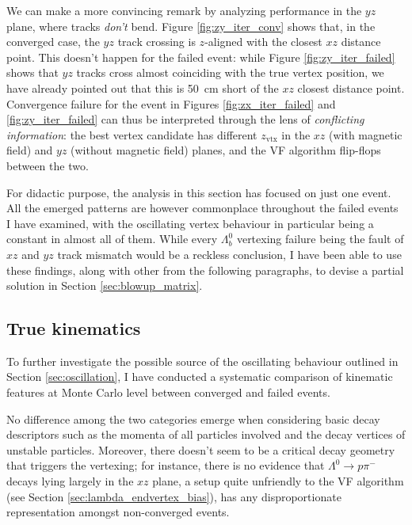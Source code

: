 We can make a more convincing remark by analyzing performance in the $yz$ plane, where tracks \textit{don't} bend.
Figure \ref{fig:zy_iter_conv} shows that, in the converged case, the $yz$ track crossing is $z$-aligned with the closest $xz$ distance point.
This doesn't happen for the failed event: while Figure \ref{fig:zy_iter_failed} shows that $yz$ tracks cross almost coinciding with the true vertex position, we have already pointed out that this is \SI{50}{cm} short of the $xz$ closest distance point.
Convergence failure for the event in Figures \ref{fig:zx_iter_failed} and \ref{fig:zy_iter_failed} can thus be interpreted through the lens of \textit{conflicting information}:
the best vertex candidate has different $z_\text{vtx}$ in the $xz$ (with magnetic field) and $yz$ (without magnetic field) planes, and the VF algorithm flip-flops between the two.

For didactic purpose, the analysis in this section has focused on just one event.
All the emerged patterns are however commonplace throughout the failed events I have examined, with the oscillating vertex behaviour in particular being a constant in almost all of them.
While every $\Lambda_b^0$ vertexing failure being the fault of $xz$ and $yz$ track mismatch would be a reckless conclusion, I have been able to use these findings, along with other from the following paragraphs, to devise a partial solution in Section \ref{sec:blowup_matrix}.

\subsection{True kinematics}
To further investigate the possible source of the oscillating behaviour outlined in Section \ref{sec:oscillation}, I have conducted a systematic comparison of kinematic features at Monte Carlo level between converged and failed events.

No difference among the two categories emerge when considering basic decay descriptors such as the momenta of all particles involved and the decay vertices of unstable particles.
Moreover, there doesn't seem to be a critical decay geometry that triggers the vertexing;
for instance, there is no evidence that $\Lambda^0 \rightarrow p\pi^-$ decays lying largely in the $xz$ plane, a setup quite unfriendly to the VF algorithm (see Section \ref{sec:lambda_endvertex_bias}), has any disproportionate representation amongst non-converged events.

